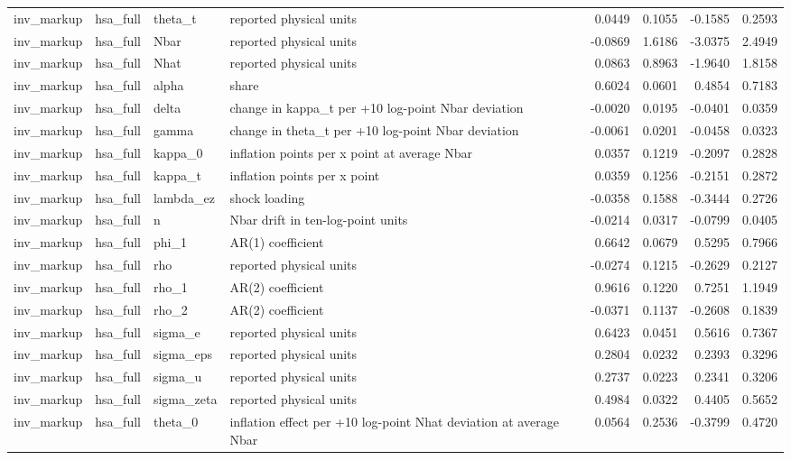 \begin{tabular}{llllrrrr}
inv\_markup & hsa\_full & theta\_t & reported physical units & 0.0449 & 0.1055 & -0.1585 & 0.2593 \\
inv\_markup & hsa\_full & Nbar & reported physical units & -0.0869 & 1.6186 & -3.0375 & 2.4949 \\
inv\_markup & hsa\_full & Nhat & reported physical units & 0.0863 & 0.8963 & -1.9640 & 1.8158 \\
inv\_markup & hsa\_full & alpha & share & 0.6024 & 0.0601 & 0.4854 & 0.7183 \\
inv\_markup & hsa\_full & delta & change in kappa\_t per +10 log-point Nbar deviation & -0.0020 & 0.0195 & -0.0401 & 0.0359 \\
inv\_markup & hsa\_full & gamma & change in theta\_t per +10 log-point Nbar deviation & -0.0061 & 0.0201 & -0.0458 & 0.0323 \\
inv\_markup & hsa\_full & kappa\_0 & inflation points per x point at average Nbar & 0.0357 & 0.1219 & -0.2097 & 0.2828 \\
inv\_markup & hsa\_full & kappa\_t & inflation points per x point & 0.0359 & 0.1256 & -0.2151 & 0.2872 \\
inv\_markup & hsa\_full & lambda\_ez & shock loading & -0.0358 & 0.1588 & -0.3444 & 0.2726 \\
inv\_markup & hsa\_full & n & Nbar drift in ten-log-point units & -0.0214 & 0.0317 & -0.0799 & 0.0405 \\
inv\_markup & hsa\_full & phi\_1 & AR(1) coefficient & 0.6642 & 0.0679 & 0.5295 & 0.7966 \\
inv\_markup & hsa\_full & rho & reported physical units & -0.0274 & 0.1215 & -0.2629 & 0.2127 \\
inv\_markup & hsa\_full & rho\_1 & AR(2) coefficient & 0.9616 & 0.1220 & 0.7251 & 1.1949 \\
inv\_markup & hsa\_full & rho\_2 & AR(2) coefficient & -0.0371 & 0.1137 & -0.2608 & 0.1839 \\
inv\_markup & hsa\_full & sigma\_e & reported physical units & 0.6423 & 0.0451 & 0.5616 & 0.7367 \\
inv\_markup & hsa\_full & sigma\_eps & reported physical units & 0.2804 & 0.0232 & 0.2393 & 0.3296 \\
inv\_markup & hsa\_full & sigma\_u & reported physical units & 0.2737 & 0.0223 & 0.2341 & 0.3206 \\
inv\_markup & hsa\_full & sigma\_zeta & reported physical units & 0.4984 & 0.0322 & 0.4405 & 0.5652 \\
inv\_markup & hsa\_full & theta\_0 & inflation effect per +10 log-point Nhat deviation at average Nbar & 0.0564 & 0.2536 & -0.3799 & 0.4720 \\

\end{tabular}
